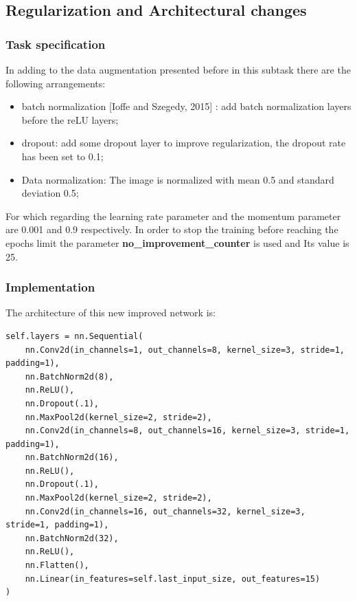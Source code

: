 \documentclass[12pt, a4paper, italian]{scrartcl}
\begin{document}
\newpage
    
    \subsection{Regularization and Architectural changes}
    \subsubsection{Task specification}
    In adding to the data augmentation presented before in this subtask there are the following arrangements:
    \begin{itemize}
	\item batch normalization [Ioffe and Szegedy, 2015]\cite{Ioffe:Szegedy} : add batch normalization layers before the reLU layers;
	\item dropout: add some dropout layer to improve regularization, the dropout rate has been set to 0.1;
	\item Data normalization: The image is normalized with mean 0.5 and standard deviation 0.5;
\end{itemize} 

For which regarding the learning rate parameter and the momentum parameter are 0.001 and 0.9 respectively.
In order to stop the training before reaching the epochs limit the parameter \textbf{no\_improvement\_counter} is used and Its value is 25.


\subsubsection{Implementation}
The architecture of this new improved network is:
\begin{verbatim} 
self.layers = nn.Sequential(
   	nn.Conv2d(in_channels=1, out_channels=8, kernel_size=3, stride=1, padding=1),
   	nn.BatchNorm2d(8),
   	nn.ReLU(),
   	nn.Dropout(.1),
   	nn.MaxPool2d(kernel_size=2, stride=2),
   	nn.Conv2d(in_channels=8, out_channels=16, kernel_size=3, stride=1, padding=1),
   	nn.BatchNorm2d(16),
   	nn.ReLU(),
   	nn.Dropout(.1),
   	nn.MaxPool2d(kernel_size=2, stride=2),
   	nn.Conv2d(in_channels=16, out_channels=32, kernel_size=3, stride=1, padding=1),
   	nn.BatchNorm2d(32),
   	nn.ReLU(),
   	nn.Flatten(),
   	nn.Linear(in_features=self.last_input_size, out_features=15)
)
\end{verbatim}
\end{document}
